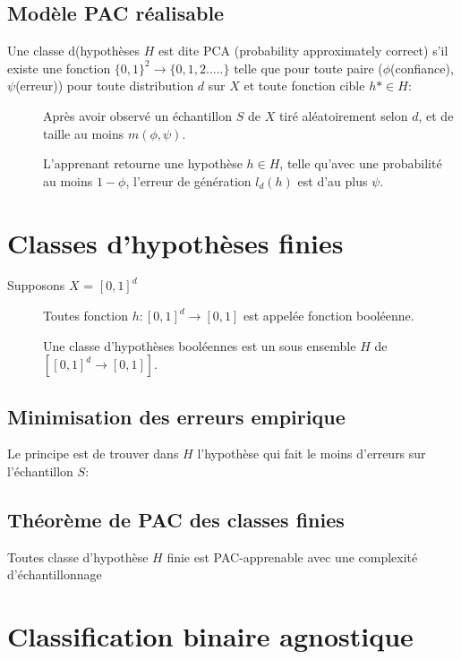 \subsection{Modèle PAC réalisable}
Une classe d(hypothèses $H$ est dite PCA (probability approximately correct) s'il existe une fonction $\{0,1\}^2 \rightarrow \{0,1,2.....\}$ telle que pour toute paire ($\phi$(confiance),$\psi$(erreur)) pour toute distribution $d$ sur $X$ et toute fonction cible $h* \in H$:
\begin{description}
\item[] Après avoir observé un échantillon $S$ de $X$ tiré aléatoirement selon $d$, et de taille au moins $m(\phi,\psi)$.
\item[] L'apprenant retourne une hypothèse $h \in H$, telle qu'avec une probabilité au moins $1 - \phi$, l'erreur de génération $l_d(h)$ est d'au plus $\psi$.
\end{description}

\section{Classes d'hypothèses finies}

Supposons $X$ = $[0,1]^d$

\begin{description}
\item[] Toutes fonction $h: [0,1]^d \rightarrow [0,1]$ est appelée fonction booléenne.
\item[] Une classe d'hypothèses booléennes est un sous ensemble $H$ de $[[0,1]^d \rightarrow [0,1]]$.
\end{description}

\subsection{Minimisation des erreurs empirique}
Le principe est de trouver dans $H$ l'hypothèse qui fait le moins d'erreurs sur l'échantillon $S$:


\subsection{Théorème de PAC des classes finies}
Toutes classe d'hypothèse $H$ finie est PAC-apprenable avec une complexité d'échantillonnage

\pagebreak
\section{Classification binaire agnostique}
